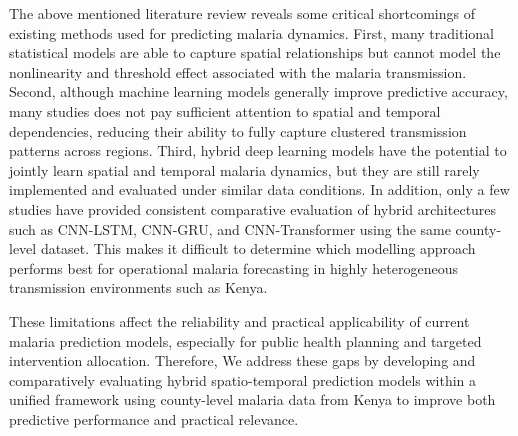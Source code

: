 The above mentioned literature review reveals some critical shortcomings of existing methods used for predicting malaria dynamics. First, many traditional statistical models are able to capture spatial relationships but cannot model the nonlinearity and threshold effect associated with the malaria transmission. Second, although machine learning models generally improve predictive accuracy, many studies does not pay sufficient attention to spatial and temporal dependencies, reducing their ability to fully capture clustered transmission patterns across regions. Third, hybrid deep learning models have the potential to jointly learn spatial and temporal malaria dynamics, but they are still rarely implemented and evaluated under similar data conditions. In addition, only a few studies have provided consistent comparative evaluation of hybrid architectures such as CNN-LSTM, CNN-GRU, and CNN-Transformer using the same county-level dataset. This makes it difficult to determine which modelling approach performs best for operational malaria forecasting in highly heterogeneous transmission environments such as Kenya.

These limitations affect the reliability and practical applicability of current malaria prediction models, especially for public health planning and targeted intervention allocation. Therefore, We address these gaps by developing and comparatively evaluating hybrid spatio-temporal prediction models within a unified framework using county-level malaria data from Kenya to improve both predictive performance and practical relevance.








